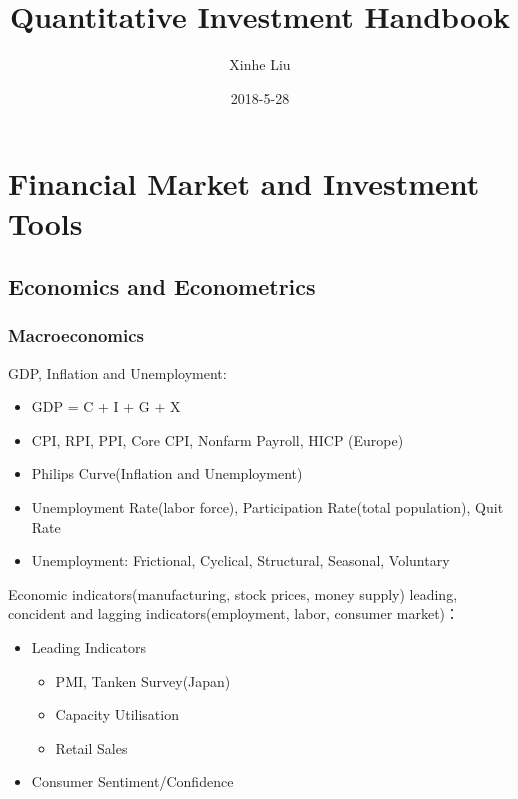 \documentclass[11pt, openany]{book}              %
\title{\bf Quantitative Investment Handbook}    %
\author{Xinhe Liu}              %
\date{2018-5-28}                           %
\begin{document}
\maketitle                              %
\tableofcontents                        %
\mainmatter                             %

\part{Financial Market and Investment Tools}

\chapter{Economics and Econometrics}

\section{Macroeconomics} 

GDP, Inflation and Unemployment:

\begin{itemize}
    \item GDP = C + I + G + X 
    \item CPI, RPI, PPI, Core CPI, Nonfarm Payroll, HICP (Europe)
    \item Philips Curve(Inflation and Unemployment)
    \item Unemployment Rate(labor force), Participation Rate(total population), Quit Rate 
    \item Unemployment: Frictional, Cyclical, Structural, Seasonal, Voluntary 
\end{itemize}


Economic indicators(manufacturing, stock prices, money supply) leading, concident and lagging indicators(employment, labor, consumer market)：
\begin{itemize}
	\item Leading Indicators \\
	\begin{itemize}
    	\item PMI, Tanken Survey(Japan)
    	\item Capacity Utilisation 
    	\item Retail Sales
	\end{itemize}
	 \item Consumer Sentiment/Confidence 
\end{itemize}
\end{document}

